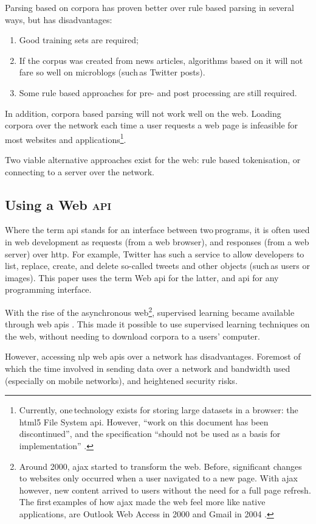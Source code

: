 Parsing based on corpora has proven better over rule based
  parsing in several ways, but has disadvantages:

\begin{enumerate}
\item Good training sets are required;
\item If the corpus was created from news articles, algorithms based on it
  will not fare so well on microblogs (such\,as Twitter posts).
\item Some rule based approaches for pre- and post processing are still
  required.
\end{enumerate}

\noindent In addition, corpora based parsing will not work well on the web.
Loading corpora over the network each time a user requests a web page is
  infeasible for most websites and applications\footnote{Currently,
      one\,technology exists for storing large datasets in a browser: the
      \acrshort{html5} File System \acrshort{api}.
    However, ``work on this document has been discontinued'', and the
      specification ``should not be used as a basis for implementation''
      \autocite{urhane-file-api}.}.

Two viable alternative approaches exist for the web: rule based tokenisation,
  or connecting to a server over the network.

\subsection{Using a Web \textsc{api}}\label{using-a-web}

Where the term \gls{api} stands for an interface between two\,programs,
  it is often used in web development as requests (from a web browser),
  and responses (from a web server) over \gls{http}.
For example, Twitter has such a service to allow developers to list,
  replace, create, and delete so-called tweets and other objects (such\,as
  users or images).
This paper uses the term Web \gls{api} for the latter, and \gls{api} for
any programming interface.

With the rise of the asynchronous web\footnote{Around 2000,
    \gls{ajax} started to transform the web.
  Before, significant changes to websites only occurred when a user
    navigated to a new page. 
  With \gls{ajax} however, new content arrived to users without the need
    for a full page refresh.
  The first\,examples of how \gls{ajax} made the web feel more like native
    applications, are Outlook Web Access in 2000
    \autocite{technet-outlook-web-access} and Gmail in 2004
    \autocite{gmailblog-gmail-ajax}.},
  supervised learning became available through web \glspl{api}
  \autocites{textteaser-web-api}{wordnet-web-api}{textrazor-web-api}.
This made it possible to use supervised learning techniques on the web,
  without needing to download corpora to a users' computer.

However, accessing \gls{nlp} web \glspl{api} over a network has
  disadvantages.
Foremost of which the time involved in sending data over a network and
  bandwidth used (especially on mobile networks), and heightened security
  risks.
